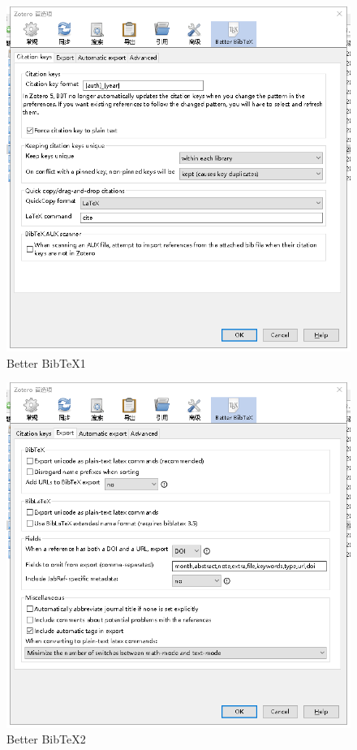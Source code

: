 \begin{figure}
	\centering
	\includegraphics[scale=0.8]{Fig/zotero9.png}
	\caption{\label{op9}Better BibTeX1}
\end{figure}
\begin{figure}
	\centering
	\includegraphics[scale=0.8]{Fig/zotero10.png}
	\caption{\label{op10}Better BibTeX2}
\end{figure}
